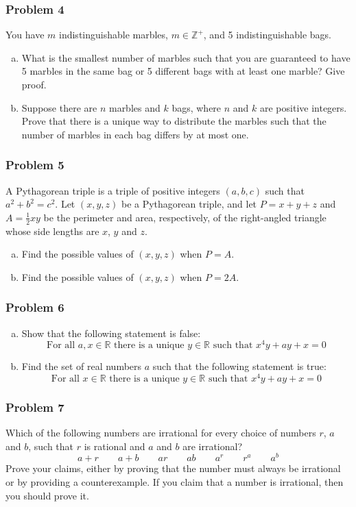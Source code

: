 \documentclass[11pt,onecolumn,fleqn]{article}
\theoremstyle{definition}
\begin{document}
\subsubsection*{Problem 4}
You have $m$ indistinguishable marbles, $m \in \mathbb{Z}^+$, and 5 indistinguishable bags.
\begin{enumerate}[(a)]
\item What is the smallest number of marbles such that you are guaranteed to have 5 marbles in the same bag or 5 different bags with at least one marble? Give proof.
\item Suppose there are $n$ marbles and $k$ bags, where $n$ and $k$ are positive integers. Prove that there is a unique way to distribute the marbles such that the number of marbles in each bag differs by at most one.
\end{enumerate}


\subsubsection*{Problem 5}
A Pythagorean triple is a triple of positive integers $(a,b,c)$ such that $a^2 + b^2 = c^2$. Let $(x,y,z)$ be a Pythagorean triple, and let $P=x+y+z$ and $A=\frac{1}{2}xy$ be the perimeter and area, 
respectively, of the right-angled triangle whose side lengths are $x$, $y$ and $z$.
\begin{enumerate}[(a)]
\item Find the possible values of $(x,y,z)$ when $P=A$.
\item Find the possible values of $(x,y,z)$ when $P=2A$.
\end{enumerate}

\subsubsection*{Problem 6}
\begin{enumerate}[(a)]
\item Show that the following statement is false:
$$\text{For all } a,x \in \mathbb{R} \text{ there is a unique } y \in \mathbb{R} \text{ such that } x^4y+ay+x=0$$
\item Find the set of real numbers $a$ such that the following statement is true:
$$\text{For all } x \in \mathbb{R} \text{ there is a unique } y \in \mathbb{R} \text{ such that } x^4y+ay+x=0$$
\end{enumerate}


\subsubsection*{Problem 7}
Which of the following numbers are irrational for every choice of numbers $r$, $a$ and $b$, such that
$r$ is rational and $a$ and $b$ are irrational?
$$a+r \qquad a+b \qquad ar \qquad ab \qquad a^r \qquad r^a \qquad a^b$$
Prove your claims, either by proving that the number must always be irrational or by providing a counterexample. 
If you claim that a number is irrational, then you should prove it.
\end{document}
